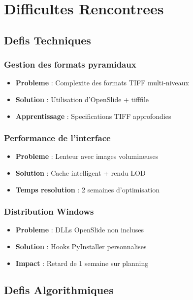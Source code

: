 \documentclass[12pt,a4paper]{article}
\begin{document}
\section{Difficultes Rencontrees}

\subsection{Defis Techniques}

\subsubsection{Gestion des formats pyramidaux}
\begin{itemize}
\item \textbf{Probleme} : Complexite des formats TIFF multi-niveaux
\item \textbf{Solution} : Utilisation d'OpenSlide + tifffile
\item \textbf{Apprentissage} : Specifications TIFF approfondies
\end{itemize}

\subsubsection{Performance de l'interface}
\begin{itemize}
\item \textbf{Probleme} : Lenteur avec images volumineuses
\item \textbf{Solution} : Cache intelligent + rendu LOD
\item \textbf{Temps resolution} : 2 semaines d'optimisation
\end{itemize}

\subsubsection{Distribution Windows}
\begin{itemize}
\item \textbf{Probleme} : DLLs OpenSlide non incluses
\item \textbf{Solution} : Hooks PyInstaller personnalises
\item \textbf{Impact} : Retard de 1 semaine sur planning
\end{itemize}

\subsection{Defis Algorithmiques}
\end{document}
